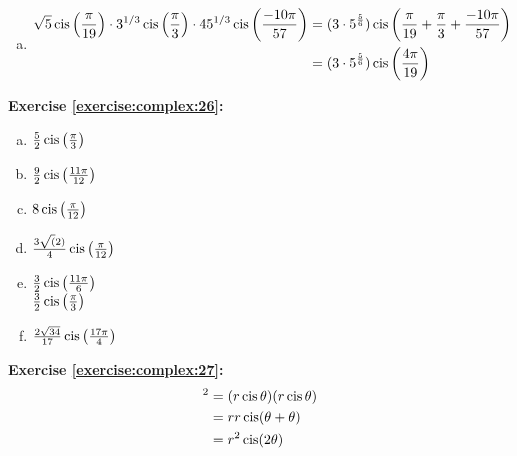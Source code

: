 \begin{enumerate}[(a)]
\item 
\begin{align*}
\sqrt{5}\operatorname{cis}\left(\frac{\pi}{19}\right)\cdot 3^{1/3} \operatorname{cis}\left(\frac{\pi}{3}\right)\cdot 45^{1/3}\operatorname{cis}\left(\frac{-10\pi}{57}\right) &= (3 \cdot 5^{\frac{5}{6}})\operatorname{cis}\left(\frac{\pi}{19} + \frac{\pi}{3} + \frac{-10\pi}{57}\right)\\
&= (3 \cdot 5^{\frac{5}{6}})\operatorname{cis}\left(\frac{4\pi}{19}\right)\\
\end{align*}
\end{enumerate}

\noindent\textbf{Exercise \ref{exercise:complex:26}:} %
\begin{multicols}{2}
\begin{enumerate}[(a)]
\item 
$\frac{5}{2}\operatorname{cis}\left(\frac{\pi}{3}\right)$

\item
$\frac{9}{2}\operatorname{cis}\left(\frac{11\pi}{12}\right)$

\item
$8\operatorname{cis}\left(\frac{\pi}{12}\right)$
 
\item
$\frac{3\sqrt(2)}{4}\operatorname{cis}\left(\frac{\pi}{12}\right)$

\item %
$\frac{3}{2}\operatorname{cis}\left(\frac{11\pi}{6}\right)$\\
$\frac{3}{2}\operatorname{cis}\left(\frac{\pi}{3}\right)$ %

\item
$\frac{2\sqrt{34}}{17}\operatorname{cis}\left(\frac{17\pi}{4}\right)$
\end{enumerate}
\end{multicols}

\noindent\textbf{Exercise \ref{exercise:complex:27}:}
\begin{align*}
[r\cis\theta]^{2} & = (r\cis\theta)(r\cis\theta)\\
& = rr\cis(\theta+\theta)\\
& = r^{2}\cis(2\theta)
\end{align*}

